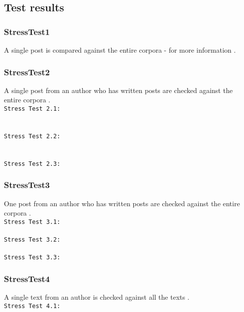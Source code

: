 \subsection{Test results}

\subsubsection{StressTest1}
A single post is compared against the entire corpora - for more information .\\


\subsubsection{StressTest2}
A single post from an author who has written  posts are checked against the entire corpora .\\
\texttt{Stress Test 2.1:}\\

\\ \\

\texttt{Stress Test 2.2:}\\
\\ \\

\texttt{Stress Test 2.3:}\\


\subsubsection{StressTest3}
One post from an author who has written  posts are checked against the entire corpora .\\
\texttt{Stress Test 3.1:}\\
\\

\texttt{Stress Test 3.2:}\\
\\

\texttt{Stress Test 3.3:}\\


\subsubsection{StressTest4}
A single text from an author is checked against all the texts  .\\
\texttt{Stress Test 4.1:}\\
\\


